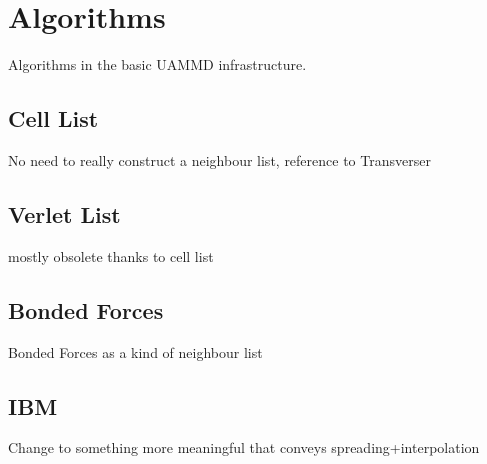 \chapter{Algorithms}\label{ch:algorithms}
Algorithms in the basic \gls{UAMMD} infrastructure. 
\section{Cell List}
No need to really construct a neighbour list, reference  to Transverser
\section{Verlet List}
mostly obsolete thanks to cell list
\section{Bonded Forces}
Bonded Forces as a kind of neighbour list
\section{IBM}
Change to something more meaningful that conveys spreading+interpolation

